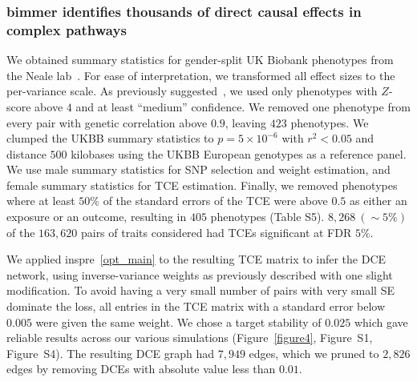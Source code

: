 \documentclass{article}
\begin{document}
\subsubsection*{bimmer identifies thousands of direct causal effects in complex pathways}
We obtained summary statistics for gender-split UK Biobank phenotypes from
the Neale lab~\cite{NealeUKBB}. For ease of interpretation,
we transformed all effect sizes to the per-variance scale. As previously suggested~\cite{BulikSullivan2015,NealeUKBB},
we used only phenotypes with $Z$-score above $4$ and at least ``medium'' confidence. We removed one phenotype from every pair with genetic
correlation above $0.9$, leaving $423$ phenotypes. We clumped the UKBB
summary statistics to $p=5 \times 10^{-6}$ with $r^2 < 0.05$ and distance $500$ kilobases using
the UKBB European genotypes as a reference panel. We use male summary statistics for SNP selection
and weight estimation, and female summary statistics for TCE estimation. Finally, we removed
phenotypes where at least $50\%$ of the standard errors of the TCE were above $0.5$
as either an exposure or an outcome, resulting in $405$ phenotypes (Table S5).
$8,268~(\sim 5\%)$ of the $163,620$ pairs of traits considered had TCEs significant at FDR $5\%$.

We applied inspre~\eqref{opt_main} to the resulting TCE matrix to infer the DCE network,
 using inverse-variance weights
as previously described with one slight modification. To avoid having a very small
number of pairs with very small SE dominate the loss, all entries in the TCE matrix with
a standard error below $0.005$ were given the same weight.
We chose a target stability of $0.025$ which gave reliable results across our various simulations
(Figure~\ref{figure4}, Figure~S1, Figure~S4). The resulting DCE graph had $7,949$ edges,
which we pruned to $2,826$ edges by removing DCEs with absolute value less than $0.01$. 
\end{document}
